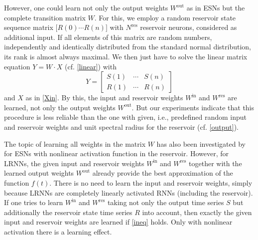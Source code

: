 \documentclass[twoside,11pt]{article}
\theoremstyle{definition}
\begin{document}
However, one could learn not only the output weights $W^\mathrm{out}$ as in ESNs
but the complete transition matrix $W$. For this, we employ a random reservoir
state sequence matrix $\big[R(0) \cdots R(n) \big]$ with $N^\mathrm{res}$
reservoir neurons, considered as additional input. If all elements of this
matrix are random numbers, independently and identically distributed from the
standard normal distribution, its rank is almost always maximal. We then just
have to solve the linear matrix equation $Y = W \cdot X$ (cf. \cref{linear})
with
\[ Y = \left[ \begin{array}{ccc}
	S(1) & \cdots & S(n)\\
	R(1) & \cdots & R(n)
\end{array} \right] \]
and $X$ as in \cref{Xin}. By this, the input and reservoir weights
$W^\mathrm{in}$ and $W^\mathrm{res}$ are learned, not only the output weights
$W^\mathrm{out}$. But our experiments indicate that this procedure is less
reliable than the one with given, i.e., predefined random input and reservoir
weights and unit spectral radius for the reservoir (cf. \cref{output}).

The topic of learning all weights in the matrix $W$ has also been investigated
by \citet{PDW13} for ESNs with nonlinear activation function in the reservoir.
However, for LRNNs, the given input and reservoir weights $W^\mathrm{in}$ and
$W^\mathrm{res}$ together with the learned output weights $W^\mathrm{out}$
already provide the best approximation of the function $f(t)$. There is no need
to learn the input and reservoir weights, simply because LRNNs are completely
linearly activated RNNs (including the reservoir). If one tries to learn
$W^\mathrm{in}$ and $W^\mathrm{res}$ taking not only the output time series $S$
but additionally the reservoir state time series $R$ into account, then exactly
the given input and reservoir weights are learned if \cref{ineq} holds. Only
with nonlinear activation there is a learning effect.
\end{document}
